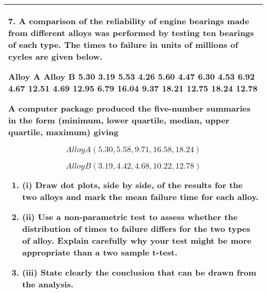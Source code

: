 \documentclass[a4paper,12pt]{article}
\begin{document}
\begin{table}[ht!]
 \centering
 \begin{tabular}{|p{15cm}|}
 \hline  
7. A comparison of the reliability of engine bearings made from different alloys was performed by testing ten bearings of each type.  The times to failure in units of millions of cycles are given below. 
 
Alloy A Alloy B   5.30   3.19   5.53   4.26   5.60   4.47   6.30   4.53   6.92   4.67 12.51   4.69 12.95   6.79 16.04   9.37 18.21 12.75 18.24 12.78 
 
A computer package produced the five-number summaries in the form (minimum, lower quartile, median, upper quartile, maximum) giving 
 
\[Alloy A   ( 5.30, 5.58, 9.71, 16.58, 18.24 ) \]
 
\[Alloy B   ( 3.19, 4.42, 4.68, 10.22, 12.78 ) \]
 
\begin{enumerate}
    \item (i) Draw dot plots, side by side, of the results for the two alloys and mark the mean failure time for each alloy.  %
\item 
(ii) Use a non-parametric test to assess whether the distribution of times to failure differs for the two types of alloy.  Explain carefully why your test might be more appropriate than a two sample t-test.  %
\item 
(iii) State clearly the conclusion that can be drawn from the analysis. 
\end{enumerate}

\\ \hline
  \end{tabular}
\end{table}
\end{document}
